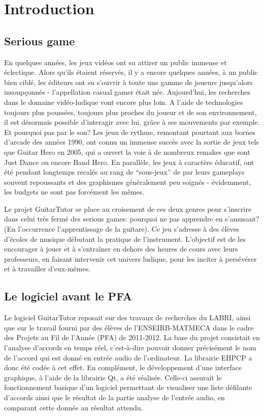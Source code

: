 \section*{Introduction}

\subsection*{Serious game}

En quelques années, les jeux vidéos ont su attirer un public immense et éclectique. Alors qu'ils étaient réservés, il y a encore quelques années, à un public bien ciblé, les éditeurs ont su s'ouvrir à toute une gamme de joueurs jusqu'alors insoupçonnés - l'appellation casual gamer était née. Aujourd'hui, les recherches dans le domaine vidéo-ludique vont encore plus loin. A l'aide de technologies toujours plus poussées, toujours plus proches du joueur et de son environnement, il est désormais possible d'interagir avec lui, grâce à ses mouvements par exemple. Et pourquoi pas par le son? Les jeux de rythme, remontant pourtant aux bornes d'arcade des années 1990, ont connu un immense succès avec la sortie de jeux tels que Guitar Hero en 2005, qui a ouvert la voie à de nombreux remakes que sont Just Dance ou encore Band Hero. En parallèle, les jeux à caractère éducatif, ont été pendant longtemps recalés au rang de “sous-jeux” de par leurs gameplays souvent repoussants et des graphismes généralement peu soignés -
évidemment, les budgets ne sont pas forcément les mêmes.

Le projet GuitarTutor se place au croisement de ces deux genres pour s'inscrire dans celui très fermé des serious games: pourquoi ne pas apprendre en s'amusant? (En l'occurrence l'apprentissage de la guitare). Ce jeu s'adresse à des élèves d'écoles de musique débutant la pratique de l'instrument. L'objectif est de les encourager à jouer et à s'entraîner en dehors des heures de cours avec leurs professeurs, en faisant intervenir cet univers ludique, pour les inciter à persévérer et à travailler d'eux-mêmes.

\subsection*{Le logiciel avant le PFA}

Le logiciel GuitarTutor reposait sur des travaux de recherches du \ac{LABRI}, ainsi que sur le travail fourni par des élèves de l'ENSEIRB-MATMECA dans le cadre des Projets au Fil de l'Année (PFA) de 2011-2012. La base du projet consistait en l'analyse d'accords en temps réel, c'est-à-dire pouvoir donner précisément le nom de l'accord qui est donné en entrée audio de l'ordinateur. La librairie EHPCP a donc été codée à cet effet. En complément, le développement d'une interface graphique, à l'aide de la librairie Qt, a été réalisée. Celle-ci assurait le fonctionnement basique d'un logiciel permettant de visualiser une liste défilante d'accords ainsi que le résultat de la partie analyse de l'entrée audio, en comparant cette donnée au résultat attendu.

